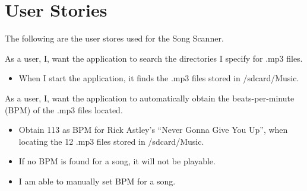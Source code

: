 \section{User Stories}
The following are the user stores used for the Song Scanner.

{As a user, I, want the application to search the directories I specify for .mp3 files.}
{\begin{itemize}
\item When I start the application, it finds the .mp3 files stored in /sdcard/Music.
\end{itemize}}

{As a user, I, want the application to automatically obtain the beats-per-minute (BPM) of the .mp3 files located.}
{\begin{itemize}
\item Obtain 113 as BPM for Rick Astley's ``Never Gonna Give You Up'', when locating the 12 .mp3 files stored in /sdcard/Music.
\item If no BPM is found for a song, it will not be playable.
\item I am able to manually set BPM for a song.
\end{itemize}}